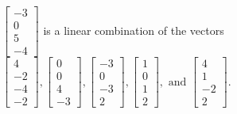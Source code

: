 \begin{exercise}
\begin{exerciseStatement}
  \end{exerciseStatement}
  \begin{exerciseAnswer}
   \(\left[\begin{array}{c}
-3 \\
0 \\
5 \\
-4
\end{array}\right]\) 
  	 is  
	a linear combination of the vectors \(\left[\begin{array}{c}
4 \\
-2 \\
-4 \\
-2
\end{array}\right] , \left[\begin{array}{c}
0 \\
0 \\
4 \\
-3
\end{array}\right] , \left[\begin{array}{c}
-3 \\
0 \\
-3 \\
2
\end{array}\right] , \left[\begin{array}{c}
1 \\
0 \\
1 \\
2
\end{array}\right] , \text{ and } \left[\begin{array}{c}
4 \\
1 \\
-2 \\
2
\end{array}\right]\).

	
  


  \end{exerciseAnswer}
\end{exercise}